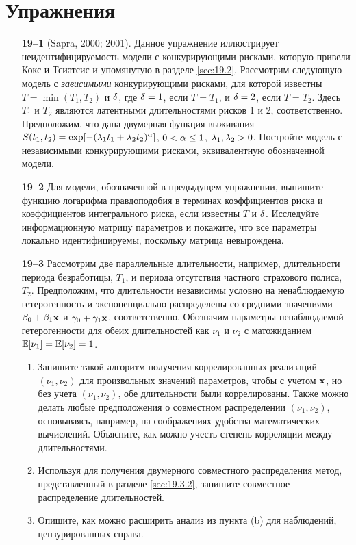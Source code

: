 \section*{Упражнения}
\begin{enumerate}

    \item[\textbf{19--1}]
(Sapra, 2000; 2001). Данное упражнение иллюстрирует неидентифицируемость модели с конкурирующими рисками, которую привели Кокс и Тсиатсис и упомянутую в разделе \ref{sec:19.2}. Рассмотрим следующую модель с \textit{зависимыми} конкурирующими рисками, для которой известны $T = \min(T_1, T_2)$ и $\delta$, где $\delta = 1$, если $T = T_1$, и $\delta = 2$, если $T = T_2$. Здесь $T_1$ и $T_2$ являются латентными длительностями рисков 1 и 2, соответственно. Предположим, что дана двумерная функция выживания $S(t_1, t_2) = \exp[-(\lambda_1 t_1 + \lambda_2 t_2)^\alpha]$, $0 < \alpha \le 1$, $\lambda_1, \lambda_2 > 0$. Постройте модель с независимыми конкурирующими рисками, эквивалентную обозначенной модели.

    \item[\textbf{19--2}]
Для модели, обозначенной в предыдущем упражнении, выпишите функцию логарифма правдоподобия в терминах коэффициентов риска и коэффициентов интегрального риска, если известны $T$ и $\delta$. Исследуйте информационную матрицу параметров и покажите, что все параметры локально идентифицируемы, поскольку матрица невырождена.

    \item[\textbf{19--3}]
Рассмотрим две параллельные длительности, например, длительности периода безработицы, $T_1$, и периода отсутствия частного страхового полиса, $T_2$. Предположим, что длительности независимы условно на ненаблюдаемую гетерогенность и экспоненциально распределены со средними значениями $\beta_0 + \beta_1\mathbf{x}$ и $\gamma_0 + \gamma_1\mathbf{x}$, соответственно. Обозначим параметры ненаблюдаемой гетерогенности для обеих длительностей как $\nu_1$ и $\nu_2$ с матожиданием $\mathbb{E}[\nu_1] = \mathbb{E}[\nu_2] = 1$.
        \begin{enumerate}
        \item
Запишите такой алгоритм получения коррелированных реализаций $(\nu_1, \nu_2)$ для произвольных значений параметров, чтобы с учетом $\mathbf{x}$, но без учета $(\nu_1, \nu_2)$, обе длительности были коррелированы. Также можно делать любые предположения о совместном распределении $(\nu_1, \nu_2)$, основываясь, например, на соображениях удобства математических вычислений. Объясните, как можно учесть степень корреляции между длительностями.
        \item
Используя для получения двумерного совместного распределения метод, представленный в разделе \ref{sec:19.3.2}, запишите совместное распределение длительностей.
        \item
Опишите, как можно расширить анализ из пункта (b) для наблюдений, цензурированных справа.
        \end{enumerate}



\end{enumerate}
